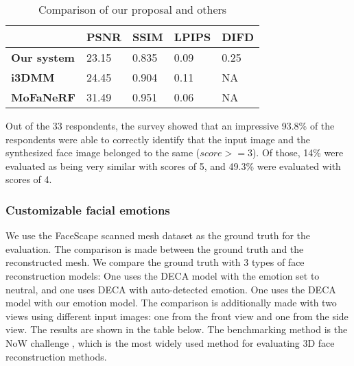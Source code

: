 \begin{table}[H]
    \centering
    \captionsetup{font=bf}
    \caption{Comparison of our proposal and others}
    \begin{tabularx}{\linewidth}{| X | X | X | X | X |}
        \hline
                            & \textbf{PSNR} & \textbf{SSIM} & \textbf{LPIPS} & \textbf{DIFD} \\ \hline\hline
        \textbf{Our system} & 23.15         & 0.835         & 0.09           & 0.25          \\ \hline %
        \textbf{i3DMM}      & 24.45         & 0.904         & 0.11           & NA            \\ \hline
        \textbf{MoFaNeRF}   & 31.49         & 0.951         & 0.06           & NA            \\ \hline
    \end{tabularx}
    \label{loss_stats}
\end{table}

Out of the 33 respondents, the survey showed that an impressive 93.8\% of the respondents were able to correctly identify that the input image and the synthesized face image belonged to the same  ($score >= 3$). Of those, 14\% were evaluated as being very similar with scores of 5, and 49.3\% were evaluated with scores of 4. %


\subsubsection{Customizable facial emotions}

We use the FaceScape scanned mesh dataset as the ground truth for the evaluation. The comparison is made between the ground truth and the reconstructed mesh. We compare the ground truth with 3 types of face reconstruction models: One uses the DECA model with the emotion set to neutral, and one uses DECA with auto-detected emotion. One uses the DECA model with our emotion model. The comparison is additionally made with two views using different input images: one from the front view and one from the side view. The results are shown in the table below. The benchmarking method is the NoW challenge \cite{RingNet:CVPR:2019}, which is the most widely used method for evaluating 3D face reconstruction methods.


